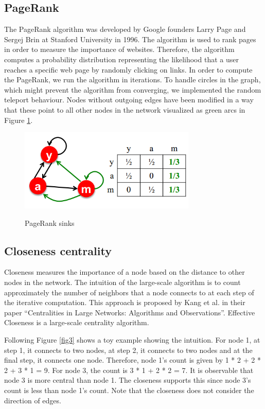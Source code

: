 \subsection{PageRank}
The PageRank algorithm was developed by Google founders Larry Page and Sergej Brin at Stanford University in 1996. The algorithm is used to rank pages in order to measure the importance of websites. Therefore, the algorithm computes a probability distribution representing the likelihood that a user reaches a specific web page by randomly clicking on links. In order to compute the PageRank, we run the algorithm in iterations. To handle circles in the graph, which might prevent the algorithm from converging, we implemented the random teleport behaviour. Nodes without outgoing edges have been modified in a way that these point to all other nodes in the network visualized as green arcs in Figure \ref{fig2}.

\begin{figure}[h]
	\begin{center}
		\label{fig2}		
		\includegraphics[width=0.75\textwidth]{fig2}	
		\caption{PageRank sinks}	
	\end{center}
\end{figure}

\subsection{Closeness centrality}
Closeness measures the importance of a node based on the distance to other nodes in the network. The intuition of the large-scale algorithm is to count approximately the number of neighbors that a node connects to at each step of the iterative computation. This approach is proposed by Kang et al. in their paper “Centralities in Large Networks: Algorithms and Observations”. Effective Closeness is a large-scale centrality algorithm. 

Following Figure \ref{fig3} shows a toy example showing the intuition. For node 1, at step 1, it connects to two nodes, at step 2, it connects to two nodes and at the final step, it  connects one node. Therefore, node 1’s count is given by 1 * 2 + 2 * 2 + 3 * 1 = 9. For node 3, the count is 3 * 1 + 2 * 2 = 7. It is observable that node 3 is more central than node 1. The closeness supports this since node 3’s count is less than node 1’s count. Note that the closeness does not consider the direction of edges.

